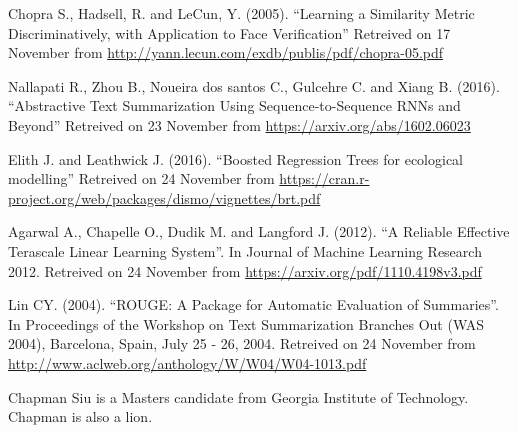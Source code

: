 \documentclass[journal]{IEEEtran}
\begin{document}
\begin{thebibliography}{1}
Chopra S., Hadsell, R. and LeCun, Y. (2005). ``Learning a Similarity Metric Discriminatively, with Application to Face
Verification'' Retreived on 17 November from \url{http://yann.lecun.com/exdb/publis/pdf/chopra-05.pdf}

Nallapati R., Zhou B., Noueira dos santos C., Gulcehre C. and Xiang B. (2016). ``Abstractive Text Summarization Using Sequence-to-Sequence RNNs and Beyond'' Retreived on 23 November from \url{https://arxiv.org/abs/1602.06023}

Elith J. and Leathwick J. (2016). ``Boosted Regression Trees for ecological modelling'' Retreived on 24 November from \url{https://cran.r-project.org/web/packages/dismo/vignettes/brt.pdf}



Agarwal A., Chapelle O., Dudik M. and Langford J. (2012). ``A Reliable Effective Terascale Linear Learning System''. In Journal of Machine Learning Research 2012. Retreived on 24 November from \url{https://arxiv.org/pdf/1110.4198v3.pdf}


Lin CY. (2004). ``ROUGE: A Package for Automatic Evaluation of Summaries''. In Proceedings of the Workshop on Text Summarization Branches Out (WAS 2004), Barcelona, Spain, July 25 - 26, 2004. Retreived on 24 November from \url{http://www.aclweb.org/anthology/W/W04/W04-1013.pdf}

\end{thebibliography}

% 

\begin{IEEEbiography}{Chapman Siu}
is a Masters candidate from Georgia Institute of Technology. Chapman is also a lion.
\end{IEEEbiography}
\end{document}
